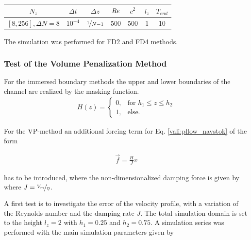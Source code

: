 \begin{center}
\vspace*{0.7ex}
\begin{tabular}{c|c|c|c|c|c|c }
 $ N_z  $                   & $\Delta t$ & $\Delta z$            & $\mbox{\textit{Re}}$  & $c^2$   & $l_z$ & $T_{end}$\\
\hline
 $[8, 256], \Delta N = 8 $& $10^{-4}$ & $\nicefrac{1}{N - 1}$ & 500     & $500$   &  1   & 10\\
\end{tabular}
\vspace*{0.7ex}
\end{center}

The simulation was performed for FD2 and FD4 methods.

\subsubsection{Test of the Volume Penalization Method}


For the immersed boundary methods the upper and lower boundaries of the channel are realized by the masking function.
\begin{align}
H(z) = \begin{cases}
                    0, & \text{for \  }  h_1 \leq z \leq h_2 \\
                    1, & \text{else}.
             \end{cases}
\end{align}

For the VP-method an additional forcing term for Eq. \ref{vali:pflow_navstok} of the form

\begin{align}
    \vec{f} = \frac{H}{J}v
\end{align}

has to be introduced, where the non-dimensionalized damping force is given by where $J = \nicefrac{V_{m}}{\eta}$.

A first test is to investigate the error of the velocity profile, with a variation of the Reynolds-number and the damping rate $J$.
The total simulation domain is set to the height $l_z=2$ with $h_1=0.25$ and $h_2=0.75$.
A simulation series was performed with the main simulation parameters given by



